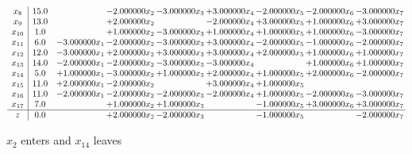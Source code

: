 \documentclass[10pt]{article}
\begin{document}
\[\begin{array}{c| c c@{\hskip 2pt} c@{\hskip 2pt} c@{\hskip 2pt} c@{\hskip 2pt} c@{\hskip 2pt} c@{\hskip 2pt} c@{\hskip 2pt} }
 x_{8}   &  15.0  &   & -2.000000 x_{2} & -3.000000 x_{3} & + 3.000000 x_{4} & -2.000000 x_{5} & -2.000000 x_{6} & -3.000000 x_{7}\\
 x_{9}   &  13.0  &   & + 2.000000 x_{2} &   & -2.000000 x_{4} & + 3.000000 x_{5} & + 1.000000 x_{6} & + 3.000000 x_{7}\\
 x_{10}   &  1.0  &   & + 1.000000 x_{2} & -3.000000 x_{3} & + 1.000000 x_{4} & + 1.000000 x_{5} & + 1.000000 x_{6} & -3.000000 x_{7}\\
 x_{11}   &  6.0 & -3.000000 x_{1} & -2.000000 x_{2} & -3.000000 x_{3} & + 3.000000 x_{4} & -2.000000 x_{5} & -1.000000 x_{6} & -2.000000 x_{7}\\
 x_{12}   &  12.0 & -3.000000 x_{1} & + 2.000000 x_{2} & + 3.000000 x_{3} & + 3.000000 x_{4} & + 2.000000 x_{5} & + 1.000000 x_{6} & + 1.000000 x_{7}\\
 x_{13}   &  14.0 & -2.000000 x_{1} & -2.000000 x_{2} & -3.000000 x_{3} & -3.000000 x_{4} &   & + 1.000000 x_{6} & + 1.000000 x_{7}\\
 x_{14}   &  5.0 & + 1.000000 x_{1} & -3.000000 x_{2} & + 1.000000 x_{3} & + 2.000000 x_{4} & + 1.000000 x_{5} & + 2.000000 x_{6} & -2.000000 x_{7}\\
 x_{15}   &  11.0 & + 2.000000 x_{1} & -2.000000 x_{2} &   & + 3.000000 x_{4} & + 1.000000 x_{5} &    &   \\
 x_{16}   &  11.0 & -2.000000 x_{1} & -2.000000 x_{2} & -2.000000 x_{3} & -2.000000 x_{4} & + 1.000000 x_{5} & -2.000000 x_{6} & -3.000000 x_{7}\\
 x_{17}   &  7.0  &   & + 1.000000 x_{2} & + 1.000000 x_{3} &   & -1.000000 x_{5} & + 3.000000 x_{6} & + 3.000000 x_{7}\\
\hline
z    &  0.0  &   & + 2.000000 x_{2} & -2.000000 x_{3} &   & -1.000000 x_{5} &   & -2.000000 x_{7}\\
\end{array}\]


 $ x_{2} $ enters and $ x_{14} $ leaves 
\end{document}
